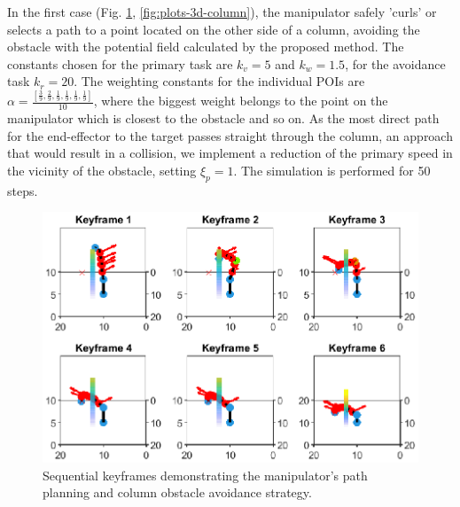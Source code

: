 \documentclass[letterpaper, 10 pt, conference]{ieeeconf}  %
\begin{document}
In the first case (Fig. \ref{fig:keyframes-3d-column}, \ref{fig:plots-3d-column}), the manipulator safely 'curls' or selects a path to a point located on the other side of a column, avoiding the obstacle with the potential field calculated by the proposed method. The constants chosen for the primary task are \( k_v = 5 \) and \( k_w = 1.5 \), for the avoidance task \(k_r=20\). The weighting constants for the individual POIs are \( \alpha = \frac{[ \frac{3}{9}, \frac{2}{9}, \frac{1}{9}, \frac{1}{9}, \frac{1}{9}, \frac{1}{9} ]}{10} \), where the biggest weight belongs to the point on the manipulator which is closest to the obstacle and so on. As the most direct path for the end-effector to the target passes straight through the column, an approach that would result in a collision, we implement a reduction of the primary speed in the vicinity of the obstacle, setting \( \xi_{p} = 1 \). The simulation is performed for 50 steps. 

\begin{figure}
	\centering
	\includegraphics[width=1\linewidth]{keyframes_3D.eps} %
	\caption{Sequential keyframes demonstrating the manipulator's path planning and column obstacle avoidance strategy.}
	\label{fig:keyframes-3d-column}
\end{figure}
\end{document}
